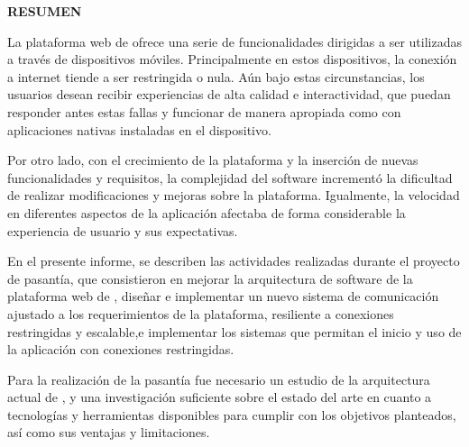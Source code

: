 \setcounter{page}{4}
\begin{center}
\textsc{\bfseries\uppercase{Resumen}}
\end{center}

La plataforma web de \business ofrece una serie de funcionalidades dirigidas a ser utilizadas a través de dispositivos móviles. Principalmente en estos dispositivos, la conexión a internet tiende a ser restringida o nula. Aún bajo estas circunstancias, los usuarios desean recibir experiencias de alta calidad e interactividad, que puedan responder antes estas fallas y funcionar de manera apropiada como con aplicaciones nativas instaladas en el dispositivo.

Por otro lado, con el crecimiento de la plataforma y la inserción de nuevas funcionalidades y requisitos, la complejidad del software incrementó la dificultad de realizar modificaciones y mejoras sobre la plataforma. Igualmente, la velocidad en diferentes aspectos de la aplicación afectaba de forma considerable la experiencia de usuario y sus expectativas.

En el presente informe, se describen las actividades realizadas durante el proyecto de pasantía, que consistieron en mejorar la arquitectura de software de la plataforma web de \business, diseñar e implementar un nuevo sistema de comunicación ajustado a los requerimientos de la plataforma, resiliente a conexiones restringidas y escalable,e implementar los sistemas que permitan el inicio y uso de la aplicación con conexiones restringidas.

Para la realización de la pasantía fue necesario un estudio de la arquitectura actual de \business, y una investigación suficiente sobre el estado del arte en cuanto a tecnologías y herramientas disponibles para cumplir con los objetivos planteados, así como sus ventajas y limitaciones.

\newpage

